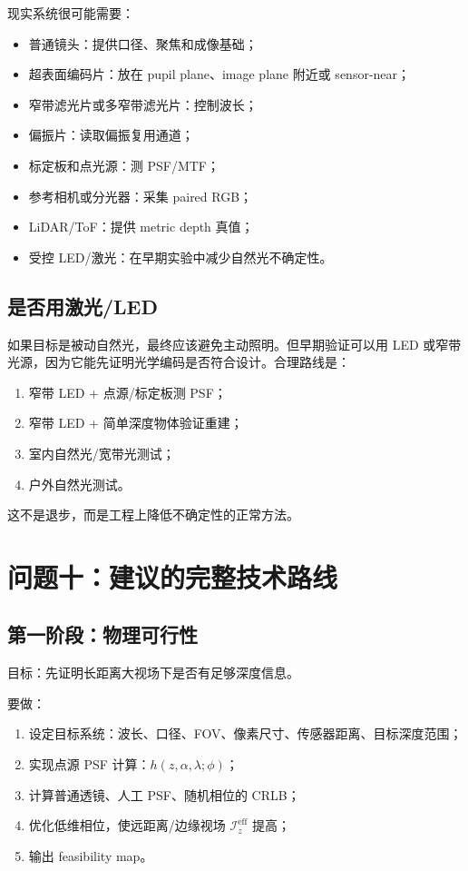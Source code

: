 \documentclass[11pt,a4paper,fontset=none]{ctexart}
\begin{document}
现实系统很可能需要：
\begin{itemize}
  \item 普通镜头：提供口径、聚焦和成像基础；
  \item 超表面编码片：放在 pupil plane、image plane 附近或 sensor-near；
  \item 窄带滤光片或多窄带滤光片：控制波长；
  \item 偏振片：读取偏振复用通道；
  \item 标定板和点光源：测 PSF/MTF；
  \item 参考相机或分光器：采集 paired RGB；
  \item LiDAR/ToF：提供 metric depth 真值；
  \item 受控 LED/激光：在早期实验中减少自然光不确定性。
\end{itemize}

\subsection{是否用激光/LED}

如果目标是被动自然光，最终应该避免主动照明。但早期验证可以用 LED 或窄带光源，因为它能先证明光学编码是否符合设计。合理路线是：
\begin{enumerate}
  \item 窄带 LED + 点源/标定板测 PSF；
  \item 窄带 LED + 简单深度物体验证重建；
  \item 室内自然光/宽带光测试；
  \item 户外自然光测试。
\end{enumerate}

这不是退步，而是工程上降低不确定性的正常方法。

\section{问题十：建议的完整技术路线}

\subsection{第一阶段：物理可行性}

目标：先证明长距离大视场下是否有足够深度信息。

要做：
\begin{enumerate}
  \item 设定目标系统：波长、口径、FOV、像素尺寸、传感器距离、目标深度范围；
  \item 实现点源 PSF 计算：$h(z,\alpha,\lambda;\phi)$；
  \item 计算普通透镜、人工 PSF、随机相位的 CRLB；
  \item 优化低维相位，使远距离/边缘视场 $\mathcal I_z^{\mathrm{eff}}$ 提高；
  \item 输出 feasibility map。
\end{enumerate}
\end{document}
